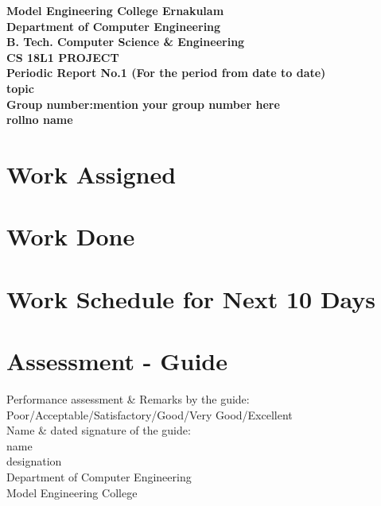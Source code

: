 \documentclass{article}
\begin{document}
\begin{center}
\textbf{
  Model Engineering College Ernakulam
\\Department of Computer Engineering
\\B. Tech. Computer Science \& Engineering 
\\CS 18L1 PROJECT
\\Periodic Report No.1 (For the period from date to date)
\\topic
\\Group number:mention your group number here
\\rollno name}
\end{center}

\section{Work Assigned}


\section{Work Done}


\section{Work Schedule for Next 10 Days}

 


\section{Assessment -  Guide}
Performance assessment \& Remarks by the guide: Poor/Acceptable/Satisfactory/Good/Very Good/Excellent
\vspace{.9in}
\\Name \& dated signature of the guide:\\
name \\
designation \\
Department of Computer Engineering \\
Model Engineering College \\
\end{document}
